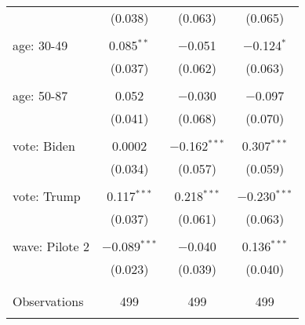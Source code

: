 \begin{tabular}{@{\extracolsep{5pt}}lccc}
  & (0.038) & (0.063) & (0.065) \\ 
  & & & \\ 
 age: 30-49 & 0.085$^{**}$ & $-$0.051 & $-$0.124$^{*}$ \\ 
  & (0.037) & (0.062) & (0.063) \\ 
  & & & \\ 
 age: 50-87 & 0.052 & $-$0.030 & $-$0.097 \\ 
  & (0.041) & (0.068) & (0.070) \\ 
  & & & \\ 
 vote: Biden & 0.0002 & $-$0.162$^{***}$ & 0.307$^{***}$ \\ 
  & (0.034) & (0.057) & (0.059) \\ 
  & & & \\ 
 vote: Trump & 0.117$^{***}$ & 0.218$^{***}$ & $-$0.230$^{***}$ \\ 
  & (0.037) & (0.061) & (0.063) \\ 
  & & & \\ 
 wave: Pilote 2 & $-$0.089$^{***}$ & $-$0.040 & 0.136$^{***}$ \\ 
  & (0.023) & (0.039) & (0.040) \\ 
  & & & \\ 
\hline \\[-1.8ex] 

Observations & 499 & 499 & 499 \\ 
\hline 
\hline \\[-1.8ex] 
\end{tabular} 